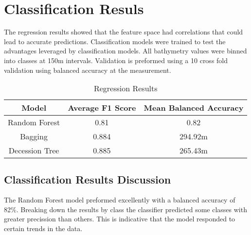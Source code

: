 \section{Classification Resuls}
\setlength{\parindent}{10ex}
The regression results showed that the feature space had correlations that could lead to accurate predictions.
Classification models were trained to test the advantages leveraged by classification models.
All bathymetry values were binned into classes at 150m intervals.
Validation is preformed using a 10 cross fold validation using balanced accuracy at the measurement.



\begin{center}
    \begin{table}[htb]
        \begin{tabular}{|c c c|}
            \hline
			\textbf{Model} & \textbf{Average F1 Score} & \textbf{Mean Balanced Accuracy} \\
			\hline
			Random Forest & 0.81 & 0.82 \\
			Bagging & 0.884 & 294.92m \\
	        Decession Tree & 0.885 & 265.43m \\
			\hline
        \end{tabular}
        \label{table:REGRESSION_RESULTS}
        \caption{Regression Results}
    \end{table}
\end{center}

\subsection{Classification Results Discussion}
The Random Forest model preformed excellently with a balanced accuracy of 82\%.
Breaking down the results by class the classifier predicted some classes with greater precission than others.
This is indicative that the model responded to certain trends in the data.

